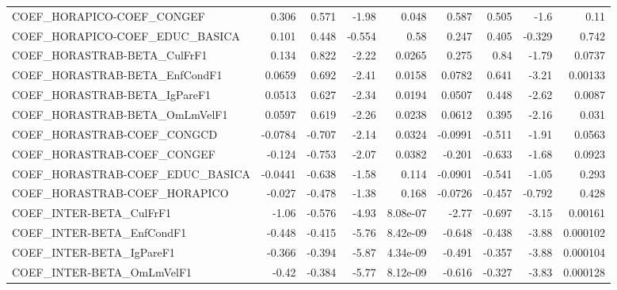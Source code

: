 \begin{tabular}{lrrrrrrrr}
COEF\_HORAPICO-COEF\_CONGEF             &       0.306 &        0.571 &   -1.98 &    0.048 &      0.587 &       0.505 &         -1.6 &          0.11 \\
COEF\_HORAPICO-COEF\_EDUC\_BASICA        &       0.101 &        0.448 &  -0.554 &     0.58 &      0.247 &       0.405 &       -0.329 &         0.742 \\
COEF\_HORASTRAB-BETA\_CulFrF1           &       0.134 &        0.822 &   -2.22 &   0.0265 &      0.275 &        0.84 &        -1.79 &        0.0737 \\
COEF\_HORASTRAB-BETA\_EnfCondF1         &      0.0659 &        0.692 &   -2.41 &   0.0158 &     0.0782 &       0.641 &        -3.21 &       0.00133 \\
COEF\_HORASTRAB-BETA\_IgPareF1          &      0.0513 &        0.627 &   -2.34 &   0.0194 &     0.0507 &       0.448 &        -2.62 &        0.0087 \\
COEF\_HORASTRAB-BETA\_OmLmVelF1         &      0.0597 &        0.619 &   -2.26 &   0.0238 &     0.0612 &       0.395 &        -2.16 &         0.031 \\
COEF\_HORASTRAB-COEF\_CONGCD            &     -0.0784 &       -0.707 &   -2.14 &   0.0324 &    -0.0991 &      -0.511 &        -1.91 &        0.0563 \\
COEF\_HORASTRAB-COEF\_CONGEF            &      -0.124 &       -0.753 &   -2.07 &   0.0382 &     -0.201 &      -0.633 &        -1.68 &        0.0923 \\
COEF\_HORASTRAB-COEF\_EDUC\_BASICA       &     -0.0441 &       -0.638 &   -1.58 &    0.114 &    -0.0901 &      -0.541 &        -1.05 &         0.293 \\
COEF\_HORASTRAB-COEF\_HORAPICO          &      -0.027 &       -0.478 &   -1.38 &    0.168 &    -0.0726 &      -0.457 &       -0.792 &         0.428 \\
COEF\_INTER-BETA\_CulFrF1               &       -1.06 &       -0.576 &   -4.93 & 8.08e-07 &      -2.77 &      -0.697 &        -3.15 &       0.00161 \\
COEF\_INTER-BETA\_EnfCondF1             &      -0.448 &       -0.415 &   -5.76 & 8.42e-09 &     -0.648 &      -0.438 &        -3.88 &      0.000102 \\
COEF\_INTER-BETA\_IgPareF1              &      -0.366 &       -0.394 &   -5.87 & 4.34e-09 &     -0.491 &      -0.357 &        -3.88 &      0.000104 \\
COEF\_INTER-BETA\_OmLmVelF1             &       -0.42 &       -0.384 &   -5.77 & 8.12e-09 &     -0.616 &      -0.327 &        -3.83 &      0.000128 \\

\end{tabular}
